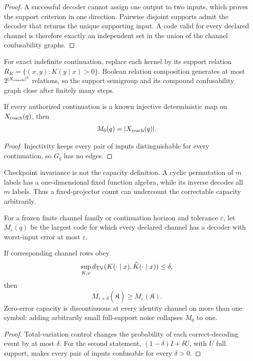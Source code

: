 \begin{proof}
A successful decoder cannot assign one output to two inputs, which proves the
support criterion in one direction. Pairwise disjoint supports admit the
decoder that returns the unique supporting input. A code valid for every
declared channel is therefore exactly an independent set in the union of the
channel confusability graphs.
\end{proof}

For exact indefinite continuation, replace each kernel by its support relation
\(R_K=\{(x,y):K(y\mid x)>0\}\). Boolean relation composition generates at
most \(2^{|X_{\rm reach}|^2}\) relations, so the support semigroup and its
compound confusability graph close after finitely many steps.

\begin{theorem}\label{cor:reversible-public-capacity}
If every authorized continuation is a known injective deterministic map on
\(X_{\rm reach}(q)\), then
\[
M_0(q)=|X_{\rm reach}(q)|.
\]
\end{theorem}

\begin{proof}
Injectivity keeps every pair of inputs distinguishable for every
continuation, so \(G_q\) has no edges.
\end{proof}

Checkpoint invariance is not the capacity definition. A cyclic permutation
of \(m\) labels has a one-dimensional fixed function algebra, while its
inverse decodes all \(m\) labels. Thus a fixed-projector count can undercount
the correctable capacity arbitrarily.

For a frozen finite channel family or continuation horizon and tolerance
\(\varepsilon\), let \(M_\varepsilon(q)\) be the largest code for which every
declared channel has a decoder with worst-input error at most
\(\varepsilon\).

\begin{theorem}
\label{thm:capacity-stability}
If corresponding channel rows obey
\[
\sup_{K,x}d_{\rm TV}(K(\cdot\mid x),\widehat K(\cdot\mid x))\le\delta,
\]
then
\[
M_{\varepsilon+\delta}(\widehat{\mathfrak K})
\ge M_\varepsilon(\mathfrak K).
\]
Zero-error capacity is discontinuous at every identity channel on more than
one symbol: adding arbitrarily small full-support noise collapses \(M_0\) to
one.
\end{theorem}

\begin{proof}
Total-variation control changes the probability of each correct-decoding
event by at most \(\delta\). For the second statement,
\((1-\delta)I+\delta U\), with \(U\) full support, makes every pair of inputs
confusable for every \(\delta>0\).
\end{proof}

